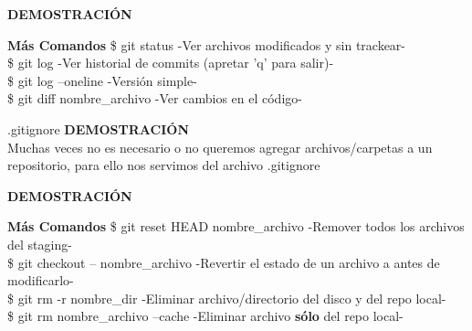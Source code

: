 \documentclass{beamer}
\begin{document}
	\begin{frame}
		\textbf{DEMOSTRACIÓN} 
		\begin{block}{\textbf{Más Comandos}}
			\vspace{0.3cm}
			 \$ git status   \small -Ver archivos modificados y sin trackear- \\
			\vspace{0.3cm}
			 \$ git log    \small -Ver historial de commits (apretar 'q' para salir)-\\
			\vspace{0.3cm}
			\$ git log --oneline   \small -Versión simple-\\
			\vspace{0.3cm}
		    \$ git diff nombre\_archivo    \small -Ver cambios en el código-\\
			\vspace{0.3cm}
		\end{block}	
	\end{frame}

	\begin{frame}{.gitignore}
		\textbf{DEMOSTRACIÓN} \\
		\vspace{.5cm}
		Muchas veces no es necesario o no queremos agregar archivos/carpetas a un repositorio, para ello nos servimos del archivo .gitignore
	\end{frame}

	\begin{frame}
	\textbf{DEMOSTRACIÓN} 
		\begin{block}{\textbf{Más Comandos}}
			\vspace{0.3cm}
			\small \$ git reset HEAD nombre\_archivo   \tiny -Remover todos los archivos del staging- \\
			\vspace{0.3cm}
			\small \$ git checkout -- nombre\_archivo \tiny -Revertir el estado de un archivo a antes de modificarlo-\\
			\vspace{0.3cm}
			\small \$ git rm -r nombre\_dir   \tiny -Eliminar archivo/directorio del disco y del repo local-\\
			\vspace{0.3cm}
			\small \$ git rm nombre\_archivo --cache   \tiny -Eliminar archivo \textbf{sólo} del repo local-\\
			\vspace{0.3cm}
		\end{block}	
	\end{frame}
	
\end{document}
